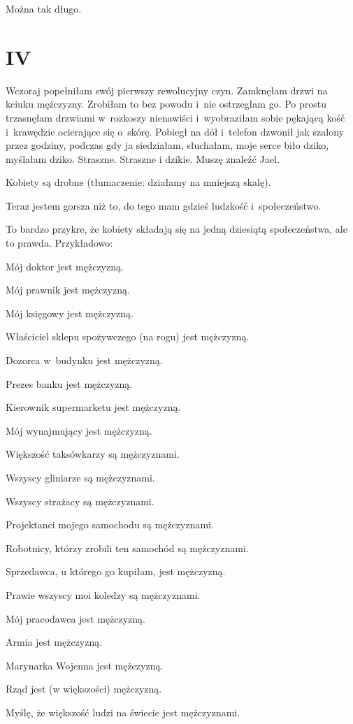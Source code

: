 \documentclass[oneside,polish,12pt,sfheadings]{mwbk}
\begin{document}
Można tak długo.

\chapter{IV}

Wczoraj popełniłam swój pierwszy rewolucyjny czyn. Zamknęłam drzwi
na kciuku mężczyzny. Zrobiłam to bez powodu i~nie ostrzegłam go. Po
prostu trzasnęłam drzwiami w~rozkoszy nienawiści i~wyobraziłam sobie
pękającą kość i~krawędzie ocierające się o~skórę. Pobiegł na dół i~telefon dzwonił jak szalony przez godziny, podczas gdy ja siedziałam,
słuchałam, moje serce biło dziko, myślałam dziko. Straszne. Straszne
i dzikie. Muszę znaleźć Jael.

Kobiety są drobne (tłumaczenie: działamy na mniejszą skalę).

Teraz jestem gorsza niż to, do tego mam gdzieś ludzkość i~społeczeństwo.

To bardzo przykre, że kobiety składają się na jedną dziesiątą społeczeństwa,
ale to prawda. Przykładowo: 

Mój doktor jest mężczyzną.

Mój prawnik jest mężczyzną.

Mój księgowy jest mężczyzną.

Właściciel sklepu spożywczego (na rogu) jest mężczyzną.

Dozorca w~budynku jest mężczyzną.

Prezes banku jest mężczyzną.

Kierownik supermarketu jest mężczyzną.

Mój wynajmujący jest mężczyzną.

Większość taksówkarzy są mężczyznami.

Wszyscy gliniarze są mężczyznami.

Wszyscy strażacy są mężczyznami.

Projektanci mojego samochodu są mężczyznami.

Robotnicy, którzy zrobili ten samochód są mężczyznami.

Sprzedawca, u którego go kupiłam, jest mężczyzną.

Prawie wszyscy moi koledzy są mężczyznami.

Mój pracodawca jest mężczyzną.

Armia jest mężczyzną.

Marynarka Wojenna jest mężczyzną.

Rząd jest (w większości) mężczyzną.

Myślę, że większość ludzi na świecie jest mężczyznami.
\end{document}
